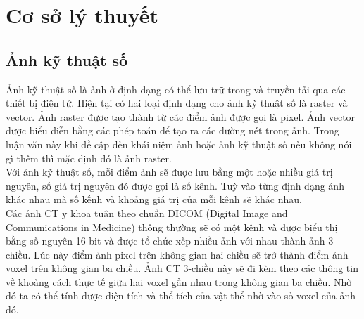 \chapter{Cơ sở lý thuyết}
\section{Ảnh kỹ thuật số}
Ảnh kỹ thuật số là ảnh ở định dạng có thể lưu trữ trong và truyền tải qua các thiết bị điện tử. Hiện tại có hai loại định dạng cho ảnh kỹ thuật số là raster và vector. Ảnh raster được tạo thành từ các điểm ảnh được gọi là pixel. Ảnh vector được biểu diễn bằng các phép toán để tạo ra các đường nét trong ảnh. Trong luận văn này khi đề cập đến khái niệm ảnh hoặc ảnh kỹ thuật số nếu không nói gì thêm thì mặc định đó là ảnh raster.\\
Với ảnh kỹ thuật số, mỗi điểm ảnh sẽ được lưu bằng một hoặc nhiều giá trị nguyên, số giá trị nguyên đó được gọi là số kênh. Tuỳ vào từng định dạng ảnh khác nhau mà số kếnh và khoảng giá trị của mỗi kênh sẽ khác nhau.\\
Các ảnh CT y khoa tuân theo chuẩn DICOM (Digital Image and Communications in Medicine) thông thường sẽ có một kênh và được biểu thị bằng số nguyên 16-bit và được tổ chức xếp nhiều ảnh với nhau thành ảnh 3-chiều. Lúc này điểm ảnh pixel trên không gian hai chiều sẽ trở thành điểm ảnh voxel trên không gian ba chiều. Ảnh CT 3-chiều này sẽ đi kèm theo các thông tin về khoảng cách thực tế giữa hai voxel gần nhau trong không gian ba chiều. Nhờ đó ta có thể tính được diện tích và thể tích của vật thể nhờ vào số voxel của ảnh đó.

